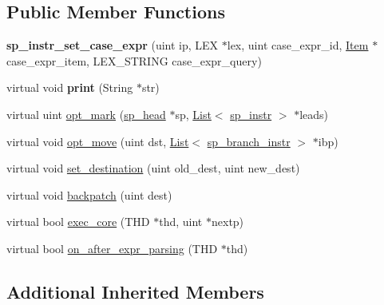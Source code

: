 \subsection*{Public Member Functions}
\begin{DoxyCompactItemize}
\item 
\mbox{\label{classsp__instr__set__case__expr_a141f91f82accfe924930a7bd4e3243b0}} 
{\bfseries sp\+\_\+instr\+\_\+set\+\_\+case\+\_\+expr} (uint ip, L\+EX $\ast$lex, uint case\+\_\+expr\+\_\+id, \mbox{\hyperlink{classItem}{Item}} $\ast$case\+\_\+expr\+\_\+item, L\+E\+X\+\_\+\+S\+T\+R\+I\+NG case\+\_\+expr\+\_\+query)
\item 
\mbox{\label{classsp__instr__set__case__expr_a8b42881fb5bff2662bcd56092c922d39}} 
virtual void {\bfseries print} (String $\ast$str)
\item 
virtual uint \mbox{\hyperlink{classsp__instr__set__case__expr_a40890fccd0dca44d11d61dcb0a88b043}{opt\+\_\+mark}} (\mbox{\hyperlink{classsp__head}{sp\+\_\+head}} $\ast$sp, \mbox{\hyperlink{classList}{List}}$<$ \mbox{\hyperlink{classsp__instr}{sp\+\_\+instr}} $>$ $\ast$leads)
\item 
virtual void \mbox{\hyperlink{classsp__instr__set__case__expr_abc03926238c4442d32e3bfb4d89fcac1}{opt\+\_\+move}} (uint dst, \mbox{\hyperlink{classList}{List}}$<$ \mbox{\hyperlink{classsp__branch__instr}{sp\+\_\+branch\+\_\+instr}} $>$ $\ast$ibp)
\item 
virtual void \mbox{\hyperlink{classsp__instr__set__case__expr_a7b2952b03aa0a30f407d88fd75ebdbae}{set\+\_\+destination}} (uint old\+\_\+dest, uint new\+\_\+dest)
\item 
virtual void \mbox{\hyperlink{classsp__instr__set__case__expr_a5d4c9c2460d84b449e5796186407b7b4}{backpatch}} (uint dest)
\item 
virtual bool \mbox{\hyperlink{classsp__instr__set__case__expr_a986c16ff3c1be65fe0653dda3104b0d8}{exec\+\_\+core}} (T\+HD $\ast$thd, uint $\ast$nextp)
\item 
virtual bool \mbox{\hyperlink{classsp__instr__set__case__expr_a041681a8ad6a4b3aeda887f5537ad624}{on\+\_\+after\+\_\+expr\+\_\+parsing}} (T\+HD $\ast$thd)
\end{DoxyCompactItemize}
\subsection*{Additional Inherited Members}


